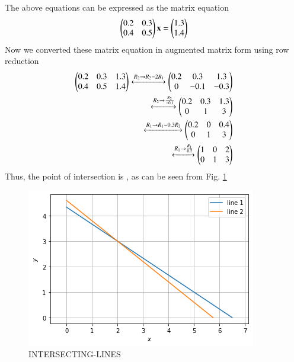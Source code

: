 The above equations can be expressed as the matrix equation
\begin{align}
\begin{pmatrix}0.2 & 0.3\\0.4 & 0.5\end{pmatrix} \mathbf{x} = \begin{pmatrix}1.3\\1.4\end{pmatrix}
\end{align}
%
Now we converted these matrix equation in augmented matrix form using row reduction
\begin{align}
\begin{pmatrix}0.2 & 0.3 & 1.3\\0.4 & 0.5 & 1.4 \end{pmatrix} 
\xleftrightarrow {R_2\rightarrow R_2-2R_1}\begin{pmatrix}0.2 & 0.3 & 1.3\\0 & -0.1 & -0.3\end{pmatrix} 
\\
\xleftrightarrow {R_2\rightarrow \frac{R_2}{-0.1}}\begin{pmatrix}0.2 & 0.3 & 1.3 \\0 & 1 & 3\end{pmatrix}
\\
\xleftrightarrow {R_1\rightarrow R_1-0.3R_2}\begin{pmatrix}0.2 & 0 & 0.4 \\0 & 1 & 3\end{pmatrix}
\\
\xleftrightarrow {R_1\rightarrow \frac{R_1}{0.2}}\begin{pmatrix}1 & 0 & 2 \\0 & 1 & 3\end{pmatrix}
\end{align}
%
Thus, the point of intersection is , as can be seen from Fig. \ref{linform/10/fig:INTERSECTING LINES.}
%
\begin{figure}[ht!]
\centering
\includegraphics[width=\columnwidth]{solutions/su2021/2/10/FIGURES/INTERSECTING-LINE.png}
\caption{INTERSECTING-LINES}
\label{linform/10/fig:INTERSECTING LINES.}
\end{figure} 


